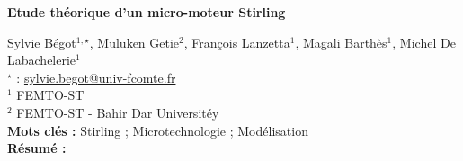 


    \newpage


%
\begin{flushleft}
\addtocounter{section}{1}
{\Large \textbf{Etude théorique d'un micro-moteur Stirling}}\label{ref:68}
\end{flushleft}
%
Sylvie Bégot$^{1,\star}$, Muluken Getie$^{2}$, François Lanzetta$^{1}$, Magali Barthès$^{1}$, Michel De Labachelerie$^{1}$\\[2mm]
$^{\star}$ \Letter : \url{sylvie.begot@univ-fcomte.fr}\\[2mm]
{\footnotesize $^{1}$ FEMTO-ST}\\
{\footnotesize $^{2}$ FEMTO-ST - Bahir Dar Universitéy}\\
[4mm]
%
\noindent \textbf{Mots clés : } Stirling ; Microtechnologie ; Modélisation\\[4mm]
%
\noindent \textbf{Résumé : } 

